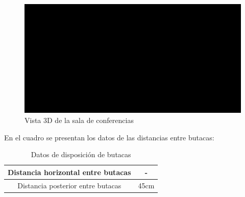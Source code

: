 \begin{figure}[H]
	\centering
	\includegraphics[width=1\textwidth]{./img/sala3D.png}
	\caption{Vista 3D de la sala de conferencias}
	\label{fig:vista_3D_sala}
\end{figure}


\par En el cuadro se presentan los datos de las distancias entre butacas:

\begin{table}[H]
\setlength\arrayrulewidth{1pt}
    \centering
    \begin{tabular}{|c|c|} \hline
        Distancia horizontal entre butacas & -  \\ \hline
        Distancia posterior entre butacas  & 45cm  \\ \hline
    \end{tabular}
    \caption{Datos de disposición de butacas}
    \label{tab:my_label}
\end{table}
